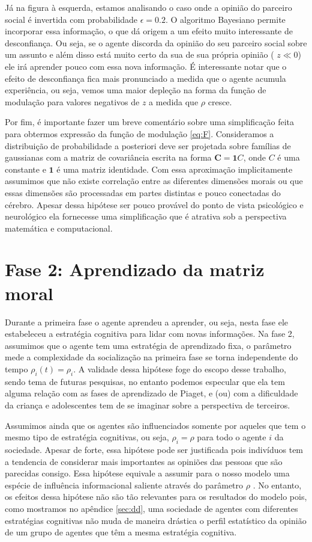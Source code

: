 Já na figura à esquerda, estamos analisando o caso onde a opinião do parceiro
social é invertida com probabilidade  $\epsilon=0.2$.  O algoritmo Bayesiano
permite incorporar essa informação, o que dá origem a um efeito muito
interessante de desconfiança. Ou seja, se o agente discorda da opinião do
seu parceiro social sobre um assunto e além disso está muito certo da sua
de sua própria opinião ( $z \ll 0$) ele irá aprender pouco com essa nova
informação. É interessante notar que o  efeito de desconfiança fica mais
pronunciado a medida que o agente acumula experiência, ou seja, vemos uma
maior depleção na forma da função de modulação para valores negativos
de $z$ a medida que $\rho$ cresce.

Por fim, é importante fazer um breve comentário sobre uma
simplificação feita para obtermos expressão da função de modulação
\ref{eq:F}. Consideramos a distribuição de probabilidade a posteriori deve
ser projetada sobre famílias de gaussianas com a matriz de covariância
escrita na forma $\bm C = \bm 1 C$, onde $C$ é uma constante e $\bm 1$
é uma matriz identidade. Com essa aproximação implicitamente assumimos
que não existe correlação entre as diferentes dimensões morais ou que
essas dimensões são processadas em partes distintas e pouco conectadas
do cérebro. Apesar  dessa hipótese ser pouco provável do ponto de vista
psicológico e neurológico ela fornecesse uma simplificação que é atrativa
sob a perspectiva matemática e computacional.

\section{Fase 2: Aprendizado da matriz moral}  %

Durante a primeira fase o agente aprendeu a aprender, ou seja, nesta fase
ele estabeleceu a estratégia cognitiva para lidar com novas informações.
Na fase 2, assumimos que o agente tem uma estratégia de aprendizado
fixa, o parâmetro mede a complexidade da socialização na primeira fase
se torna independente do tempo $\rho_i(t) = \rho_i$. A validade dessa
hipótese foge do escopo desse trabalho, sendo tema de futuras pesquisas,
no entanto podemos especular que ela tem alguma relação com as fases
de aprendizado de Piaget\citep{Piaget1965}, e (ou) com a dificuldade
da criança e adolescentes tem de se imaginar sobre a perspectiva de
terceiros.

Assumimos ainda que os agentes são influenciados somente por aqueles que
tem o mesmo tipo de estratégia cognitivas, ou seja, $\rho_i = \rho$ para
todo o agente $i$ da sociedade. Apesar de forte, essa hipótese pode ser
justificada pois indivíduos tem a tendencia de considerar mais importantes
as opiniões das pessoas que são parecidas consigo. Essa hipótese equivale
a assumir para o nosso modelo uma espécie de influência informacional
saliente \citep{Abrams1990} através do parâmetro $\rho$ .  No entanto,
os efeitos dessa hipótese não são tão relevantes para os resultados
do modelo pois, como mostramos no apêndice \ref{sec:dd}, uma sociedade de
agentes com diferentes estratégias cognitivas não muda de maneira drástica
o perfil estatístico da opinião de um grupo de agentes que têm a mesma
estratégia cognitiva.

